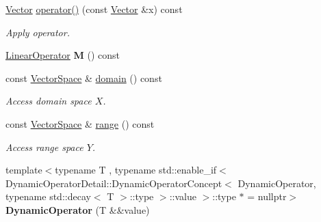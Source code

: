 \begin{DoxyCompactItemize}
\item 
\hypertarget{classSpacy_1_1DynamicOperator_ace2c2202ca6eb3fe5f5817087d30510a}{\hyperlink{classSpacy_1_1Vector}{\-Vector} \hyperlink{classSpacy_1_1DynamicOperator_ace2c2202ca6eb3fe5f5817087d30510a}{operator()} (const \hyperlink{classSpacy_1_1Vector}{\-Vector} \&x) const }\label{classSpacy_1_1DynamicOperator_ace2c2202ca6eb3fe5f5817087d30510a}

\begin{DoxyCompactList}\small\item\em \-Apply operator. \end{DoxyCompactList}\item 
\hypertarget{classSpacy_1_1DynamicOperator_a38c8c5337fd79a98a7e64139d0cbed38}{\hyperlink{classSpacy_1_1LinearOperator}{\-Linear\-Operator} {\bfseries \-M} () const }\label{classSpacy_1_1DynamicOperator_a38c8c5337fd79a98a7e64139d0cbed38}

\item 
\hypertarget{classSpacy_1_1DynamicOperator_ad457cb5571c721f97530895aa26af626}{const \hyperlink{classSpacy_1_1VectorSpace}{\-Vector\-Space} \& \hyperlink{classSpacy_1_1DynamicOperator_ad457cb5571c721f97530895aa26af626}{domain} () const }\label{classSpacy_1_1DynamicOperator_ad457cb5571c721f97530895aa26af626}

\begin{DoxyCompactList}\small\item\em \-Access domain space $X$. \end{DoxyCompactList}\item 
\hypertarget{classSpacy_1_1DynamicOperator_ab760994d921fa8d9df2882f9e4cfc9c3}{const \hyperlink{classSpacy_1_1VectorSpace}{\-Vector\-Space} \& \hyperlink{classSpacy_1_1DynamicOperator_ab760994d921fa8d9df2882f9e4cfc9c3}{range} () const }\label{classSpacy_1_1DynamicOperator_ab760994d921fa8d9df2882f9e4cfc9c3}

\begin{DoxyCompactList}\small\item\em \-Access range space $Y$. \end{DoxyCompactList}\item 
\hypertarget{classSpacy_1_1DynamicOperator_a5cc35e7a7c5a9711f465a11c81fdd29a}{{\footnotesize template$<$typename T , typename std\-::enable\-\_\-if$<$ Dynamic\-Operator\-Detail\-::\-Dynamic\-Operator\-Concept$<$ Dynamic\-Operator, typename std\-::decay$<$ T $>$\-::type $>$\-::value $>$\-::type $\ast$  = nullptr$>$ }\\{\bfseries \-Dynamic\-Operator} (\-T \&\&value)}\label{classSpacy_1_1DynamicOperator_a5cc35e7a7c5a9711f465a11c81fdd29a}


\end{DoxyCompactItemize}
